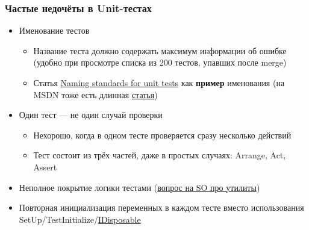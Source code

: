 \documentclass[xetex,mathserif,serif]{beamer}
\begin{document}
	\begin{frame}
		\frametitle{Частые недочёты в Unit-тестах}
		\begin{itemize}
			\item Именование тестов
			\begin{itemize}
				\item Название теста должно содержать максимум информации об ошибке (удобно при просмотре списка из 200 тестов, упавших после merge)
				\item Статья \href{http://osherove.com/blog/2005/4/3/naming-standards-for-unit-tests.html}{Naming standards for unit tests} как \textbf{пример} именования (на MSDN тоже есть длинная \href{https://msdn.microsoft.com/en-us/library/hh694602.aspx}{статья})
			\end{itemize}
			\item Один тест --- не один случай проверки
			\begin{itemize}
				\item Нехорошо, когда в одном тесте проверяется сразу несколько действий
				\item Тест состоит из трёх частей, даже в простых случаях: Arrange, Act, Assert
			\end{itemize}
			\item Неполное покрытие логики тестами (\href{https://stackoverflow.com/questions/276829/what-can-i-use-for-good-quality-code-coverage-for-c-net}{вопрос на SO про утилиты})
			\item Повторная инициализация переменных в каждом тесте вместо использования SetUp/TestInitialize/\href{https://xunit.github.io/docs/shared-context.html}{IDisposable}
		\end{itemize}
	\end{frame}
\end{document}
